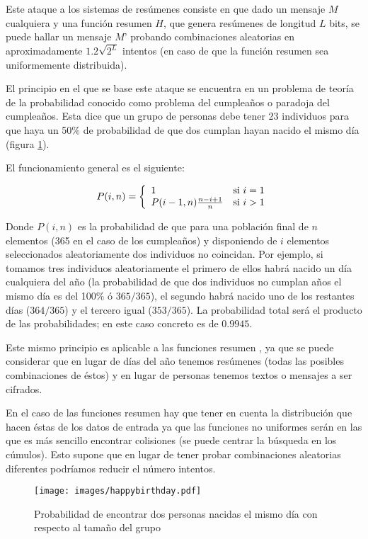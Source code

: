Este ataque a los sistemas de resúmenes consiste en que dado un mensaje $M$ cualquiera y una función resumen $H$, que genera resúmenes de longitud $L$ bits, se puede hallar un mensaje $M’$ probando combinaciones aleatorias en aproximadamente $1.2\sqrt{2^L}$ intentos \cite{website:wastahf} \cite{Oorschot:1994:PCS:191177.191231}(en caso de que la función resumen sea uniformemente distribuida).

El principio en el que se base este ataque se encuentra en un problema de teoría de la probabilidad conocido como problema del cumpleaños o paradoja del cumpleaños. Esta dice que un grupo de personas debe tener 23 individuos para que haya un 50\% de probabilidad de que dos cumplan hayan nacido el mismo día (figura \ref{fig:Birthday}).

El funcionamiento general es el siguiente:

$$
P(i, n) = \left\{
	\begin{array}{l l}
		1                        & \mbox{si $i = 1$}\\
		P(i-1, n)\frac{n-i+1}{n} & \mbox{si $i > 1$}
	\end{array} \right.
$$

Donde $P(i, n)$ es la probabilidad de que para una población final de $n$ elementos (365 en el caso de los cumpleaños) y disponiendo de $i$ elementos seleccionados aleatoriamente dos individuos no coincidan. Por ejemplo, si tomamos tres individuos aleatoriamente el primero de ellos habrá nacido un día cualquiera del año (la probabilidad de que dos individuos no cumplan años el mismo día es del 100\% ó $365/365$), el segundo habrá nacido uno de los restantes días ($364/365$) y el tercero igual ($353/365$). La probabilidad total será el producto de las probabilidades; en este caso concreto es de $0.9945$.

Este mismo principio es aplicable a las funciones resumen \cite{Bellare04hashfunction}, ya que se puede considerar que en lugar de días del año tenemos resúmenes (todas las posibles combinaciones de éstos) y en lugar de personas tenemos textos o mensajes a ser cifrados.

En el caso de las funciones resumen hay que tener en cuenta la distribución que hacen éstas de los datos de entrada ya que las funciones no uniformes serán en las que es más sencillo encontrar colisiones (se puede centrar la búsqueda en los cúmulos). Esto supone que en lugar de tener probar combinaciones aleatorias diferentes podríamos reducir el número intentos.
 
\begin{figure}
	\centering
	\texttt{[image: images/happybirthday.pdf]}
	\caption{Probabilidad de encontrar dos personas nacidas el mismo día con respecto al tamaño del grupo}\label{fig:Birthday}
\end{figure}

